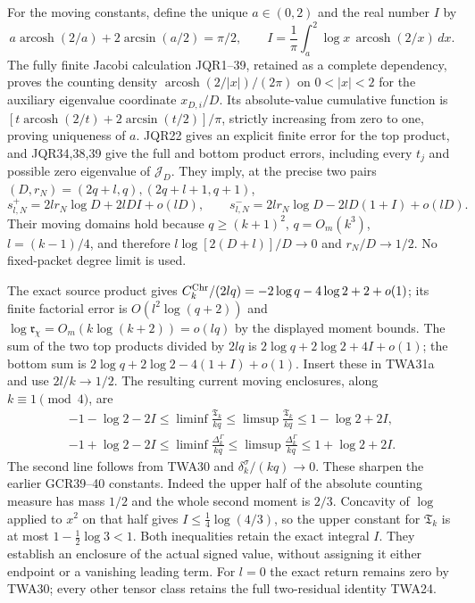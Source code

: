 For the moving constants, define the unique $a\in(0,2)$ and
the real number $I$ by
\[
 a\operatorname{arcosh}(2/a)+2\arcsin(a/2)=\pi/2,
 \qquad I=\frac1\pi\int_a^2\log x\,
                              \operatorname{arcosh}(2/x)\,dx.
\]
The fully finite Jacobi calculation JQR1--39, retained as
a complete dependency, proves the counting density
$\operatorname{arcosh}(2/|x|)/(2\pi)$ on $0<|x|<2$
for the auxiliary eigenvalue coordinate $x_{D,i}/D$.
Its absolute-value cumulative function is
$[t\operatorname{arcosh}(2/t)+2\arcsin(t/2)]/\pi$,
strictly increasing from zero to one, proving uniqueness of $a$.
JQR22 gives an explicit finite error for the top product,
and JQR34,38,39 give the full and bottom product errors,
including every $t_j$ and possible zero eigenvalue of
$\mathcal J_D$. They imply, at the precise two pairs
$(D,r_N)=(2q+l,q),(2q+l+1,q+1)$,
\[
 s^+_{l,N}=2lr_N\log D+2lDI+o(lD),\qquad
 s^-_{l,N}=2lr_N\log D-2lD(1+I)+o(lD).
\]
Their moving domains hold because $q\geq(k+1)^2$,
$q=O_m(k^3)$, $l=(k-1)/4$, and therefore
$l\log[2(D+l)]/D\to0$ and $r_N/D\to1/2$.
No fixed-packet degree limit is used.

The exact source product gives
$C_k^{\rm Chr}/(2lq)=-2\log q-4\log2+2+o(1)$;
its finite factorial error is $O(l^2\log(q+2))$ and
$\log\mathfrak r_\chi=O_m(k\log(k+2))=o(lq)$
by the displayed moment bounds.
The sum of the two top products divided by $2lq$ is
$2\log q+2\log2+4I+o(1)$; the bottom sum is
$2\log q+2\log2-4(1+I)+o(1)$.
Insert these in TWA31a and use $2l/k\to1/2$.
The resulting current moving enclosures, along $k\equiv1\pmod4$,
are
\[
\begin{gathered}
 -1-\log2-2I\leq\liminf\frac{\mathfrak T_k}{kq}
       \leq\limsup\frac{\mathfrak T_k}{kq}\leq1-\log2+2I,\\
 -1+\log2-2I\leq\liminf\frac{\Delta_k^\Gamma}{kq}
       \leq\limsup\frac{\Delta_k^\Gamma}{kq}\leq1+\log2+2I.
\end{gathered}\tag{TWA32}
\]
The second line follows from TWA30 and
$\delta_k^\sigma/(kq)\to0$. These sharpen the earlier GCR39--40
constants. Indeed the upper half of the absolute counting
measure has mass $1/2$ and the whole second moment is $2/3$.
Concavity of $\log$ applied to $x^2$ on that half gives
$I\leq\tfrac14\log(4/3)$, so the upper constant for
$\mathfrak T_k$ is at most $1-\tfrac12\log3<1$.
Both inequalities retain the exact integral $I$.
They establish an enclosure of the actual signed value,
without assigning it either endpoint or a vanishing leading term.
For $l=0$ the exact return remains zero by TWA30; every
other tensor class retains the full two-residual identity TWA24.
